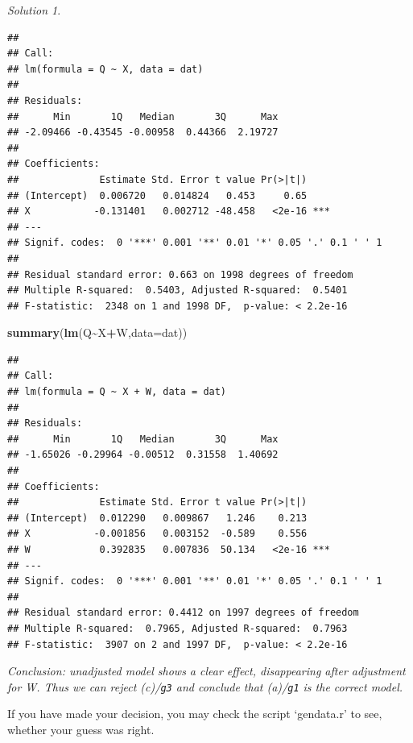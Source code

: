 \documentclass[
]{book}
\newenvironment{Shaded}{\begin{snugshade}}{\end{snugshade}}
\newcommand{\AttributeTok}[1]{\textcolor[rgb]{0.13,0.29,0.53}{#1}}
\newcommand{\FunctionTok}[1]{\textcolor[rgb]{0.13,0.29,0.53}{\textbf{#1}}}
\newcommand{\NormalTok}[1]{#1}
\newcommand{\SpecialCharTok}[1]{\textcolor[rgb]{0.81,0.36,0.00}{\textbf{#1}}}
\theoremstyle{definition}
\theoremstyle{definition}
\theoremstyle{definition}
\theoremstyle{definition}
\theoremstyle{remark}
\newtheorem*{solution}{Solution}
\begin{document}
\begin{solution}
\begin{verbatim}
## 
## Call:
## lm(formula = Q ~ X, data = dat)
## 
## Residuals:
##      Min       1Q   Median       3Q      Max 
## -2.09466 -0.43545 -0.00958  0.44366  2.19727 
## 
## Coefficients:
##              Estimate Std. Error t value Pr(>|t|)    
## (Intercept)  0.006720   0.014824   0.453     0.65    
## X           -0.131401   0.002712 -48.458   <2e-16 ***
## ---
## Signif. codes:  0 '***' 0.001 '**' 0.01 '*' 0.05 '.' 0.1 ' ' 1
## 
## Residual standard error: 0.663 on 1998 degrees of freedom
## Multiple R-squared:  0.5403, Adjusted R-squared:  0.5401 
## F-statistic:  2348 on 1 and 1998 DF,  p-value: < 2.2e-16
\end{verbatim}

\begin{Shaded}
\begin{Highlighting}[]
\FunctionTok{summary}\NormalTok{(}\FunctionTok{lm}\NormalTok{(Q}\SpecialCharTok{\textasciitilde{}}\NormalTok{X}\SpecialCharTok{+}\NormalTok{W,}\AttributeTok{data=}\NormalTok{dat))}
\end{Highlighting}
\end{Shaded}

\begin{verbatim}
## 
## Call:
## lm(formula = Q ~ X + W, data = dat)
## 
## Residuals:
##      Min       1Q   Median       3Q      Max 
## -1.65026 -0.29964 -0.00512  0.31558  1.40692 
## 
## Coefficients:
##              Estimate Std. Error t value Pr(>|t|)    
## (Intercept)  0.012290   0.009867   1.246    0.213    
## X           -0.001856   0.003152  -0.589    0.556    
## W            0.392835   0.007836  50.134   <2e-16 ***
## ---
## Signif. codes:  0 '***' 0.001 '**' 0.01 '*' 0.05 '.' 0.1 ' ' 1
## 
## Residual standard error: 0.4412 on 1997 degrees of freedom
## Multiple R-squared:  0.7965, Adjusted R-squared:  0.7963 
## F-statistic:  3907 on 2 and 1997 DF,  p-value: < 2.2e-16
\end{verbatim}

\emph{Conclusion: unadjusted model shows a clear effect, disappearing after adjustment for W. Thus we can reject (c)/\texttt{g3} and conclude that (a)/\texttt{g1} is the correct model.}
\end{solution}

If you have made your decision, you may check the script `gendata.r' to see, whether your guess was right.
\end{document}
